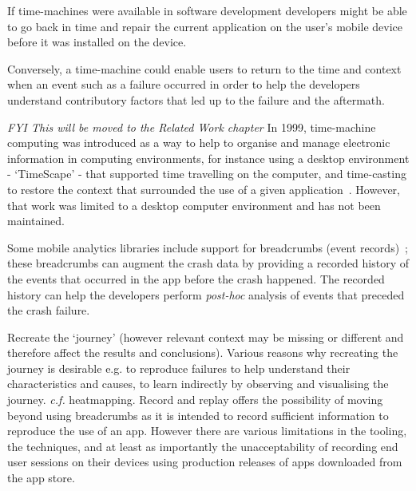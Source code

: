 
If time-machines were available in software development developers might be able to go back in time and repair the current application on the user's mobile device before it was installed on the device. 

Conversely, a time-machine could enable users to return to the time and context when an event such as a failure occurred in order to help the developers understand contributory factors that led up to the failure and the aftermath. 

\textit{FYI This will be moved to the Related Work chapter}
In 1999, time-machine computing was introduced as a way to help to organise and manage electronic information in computing environments, for instance using a desktop environment - `TimeScape' - that supported time travelling on the computer, and time-casting to restore the context that surrounded the use of a given application~\citep{rekimoto1999_time_machine_computing}. However, that work was limited to a desktop computer environment and has not been maintained. 

Some mobile analytics libraries include support for breadcrumbs (event records)~\citep[p.683]{MacLean2015_pro_android_5_book}; these breadcrumbs can augment the crash data by providing a recorded history of the events that occurred in the app before the crash happened. The recorded history can help the developers perform \emph{post-hoc} analysis of events that preceded the crash failure. 

Recreate the `journey' (however relevant context may be missing or different and therefore affect the results and conclusions). Various reasons why recreating the journey is desirable e.g. to reproduce failures to help understand their characteristics and causes, to learn indirectly by observing and visualising the journey. \emph{c.f.} heatmapping. Record and replay offers the possibility of moving beyond using breadcrumbs as it is intended to record sufficient information to reproduce the use of an app. However there are various limitations in the tooling, the techniques, and at least as importantly the unacceptability of recording end user sessions on their devices using production releases of apps downloaded from the app store. 

